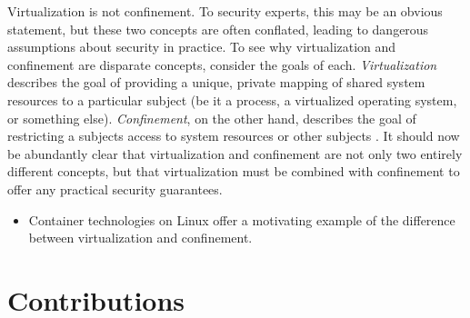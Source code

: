 Virtualization is not confinement. To security experts, this may be an obvious statement, but these two concepts are often conflated, leading to dangerous assumptions about security in practice. To see why virtualization and confinement are disparate concepts, consider the goals of each. \textit{Virtualization} describes the goal of providing a unique, private mapping of shared system resources to a particular subject  (be it a process, a virtualized operating system, or something else). \textit{Confinement}, on the other hand, describes the goal of restricting a subjects access to system resources or other subjects . It should now be abundantly clear that virtualization and confinement are not only two entirely different concepts, but that virtualization must be combined with confinement to offer any practical security guarantees.

\begin{inprogress}
\begin{itemize}
  \item Container technologies on Linux offer a motivating example of the difference between virtualization and confinement.
\end{itemize}
\end{inprogress}


\section{Contributions}%
\label{s:contributions}
